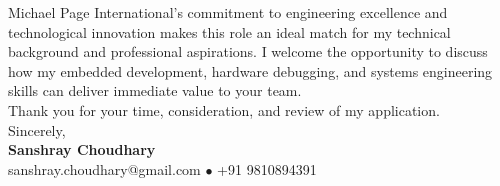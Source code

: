 \documentclass[10pt,a4paper]{article}%
\begin{document}
\noindent Michael Page International's commitment to engineering excellence and technological innovation makes this role an ideal match for my technical background and professional aspirations. I welcome the opportunity to discuss how my embedded development, hardware debugging, and systems engineering skills can deliver immediate value to your team. \vspace{8pt}\\%

\noindent Thank you for your time, consideration, and review of my application. \vspace{18pt}\\%

\noindent Sincerely, \vspace{8pt}\\%
\textbf{Sanshray Choudhary} \\%
sanshray.choudhary@gmail.com $\bullet$ +91 9810894391 \\%
\end{document}
